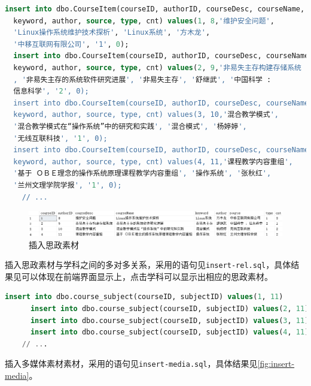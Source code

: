 \documentclass[11pt]{article}
\begin{document}
  \begin{file}
    \begin{lstlisting}[language=sql]
  insert into dbo.CourseItem(courseID, authorID, courseDesc, courseName, 
  keyword, author, source, type, cnt) values(1, 8,'维护安全问题', 
  'Linux操作系统维护技术探析', 'Linux系统', '方木龙', 
  '中移互联网有限公司', '1', 0);
  insert into dbo.CourseItem(courseID, authorID, courseDesc, courseName, 
  keyword, author, source, type, cnt) values(2, 9,'非易失主存构建存储系统
  , '非易失主存的系统软件研究进展', '非易失主存', '舒继武', '中国科学 : 
  信息科学', '2', 0);
  insert into dbo.CourseItem(courseID, authorID, courseDesc, courseName, 
  keyword, author, source, type, cnt) values(3, 10,'混合教学模式', 
  '混合教学模式在“操作系统”中的研究和实践', '混合模式', '杨婷婷', 
  '无线互联科技', '1', 0);
  insert into dbo.CourseItem(courseID, authorID, courseDesc, courseName, 
  keyword, author, source, type, cnt) values(4, 11,'课程教学内容重组', 
  '基于 ＯＢＥ理念的操作系统原理课程教学内容重组', '操作系统', '张秋红', 
  '兰州文理学院学报', '1', 0);
    // ...
    \end{lstlisting}
  \end{file}

  \begin{figure}[h]
    \centering
    \includegraphics[width=\textwidth]{insert-course.png}
    \caption{插入思政素材}
    \label{fig:insert-course}
  \end{figure}

  插入思政素材与学科之间的多对多关系，采用的语句见\verb|insert-rel.sql|，具体结果见可以体现在前端界面显示上，点击学科可以显示出相应的思政素材。

  \begin{file}
    \begin{lstlisting}[language=sql]
      insert into dbo.course_subject(courseID, subjectID) values(1, 11)
      insert into dbo.course_subject(courseID, subjectID) values(2, 11)
      insert into dbo.course_subject(courseID, subjectID) values(3, 11)
      insert into dbo.course_subject(courseID, subjectID) values(4, 11)
    // ...
    \end{lstlisting}
  \end{file}

  插入多媒体素材素材，采用的语句见\verb|insert-media.sql|，具体结果见\ref{fig:insert-media}。
\end{document}
